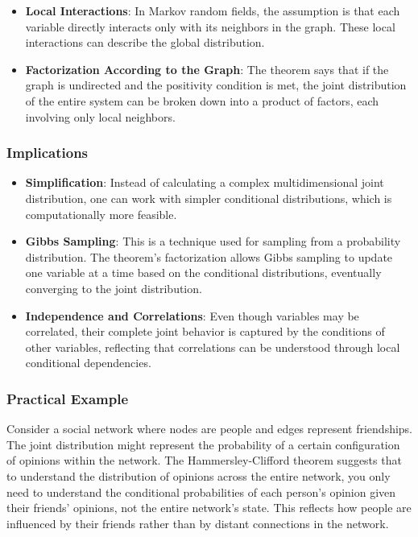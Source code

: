 \documentclass{article}
\begin{document}
\begin{itemize}
  \item \textbf{Local Interactions}: In Markov random fields, the assumption is that each variable directly interacts only with its neighbors in the graph. These local interactions can describe the global distribution.
  \item \textbf{Factorization According to the Graph}: The theorem says that if the graph is undirected and the positivity condition is met, the joint distribution of the entire system can be broken down into a product of factors, each involving only local neighbors.
\end{itemize}

\subsubsection{Implications}

\begin{itemize}
  \item \textbf{Simplification}: Instead of calculating a complex multidimensional joint distribution, one can work with simpler conditional distributions, which is computationally more feasible.
  \item \textbf{Gibbs Sampling}: This is a technique used for sampling from a probability distribution. The theorem's factorization allows Gibbs sampling to update one variable at a time based on the conditional distributions, eventually converging to the joint distribution.
  \item \textbf{Independence and Correlations}: Even though variables may be correlated, their complete joint behavior is captured by the conditions of other variables, reflecting that correlations can be understood through local conditional dependencies.
\end{itemize}

\subsubsection{Practical Example}

Consider a social network where nodes are people and edges represent friendships. The joint distribution might represent the probability of a certain configuration of opinions within the network. The Hammersley-Clifford theorem suggests that to understand the distribution of opinions across the entire network, you only need to understand the conditional probabilities of each person's opinion given their friends' opinions, not the entire network's state. This reflects how people are influenced by their friends rather than by distant connections in the network.
\end{document}
